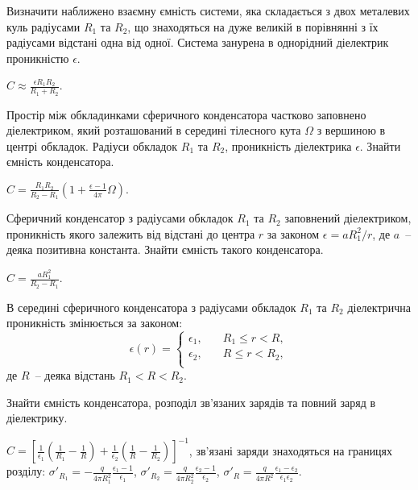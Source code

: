 \begin{problem}
Визначити наближено взаємну ємність системи, яка складається з двох  металевих куль радіусами $R_1$ та $R_2$, що знаходяться на дуже великій в порівнянні з їх радіусами відстані одна від одної. Система занурена в однорідний діелектрик проникністю $\epsilon$.
\begin{solution}
	$C \approx \frac{\epsilon R_1R_2}{R_1 + R_2}$.
\end{solution}
\end{problem}

\begin{problem} %
Простір між обкладинками сферичного конденсатора частково заповнено діелектриком, який розташований в середині тілесного кута $\Omega$ з вершиною в центрі обкладок. Радіуси обкладок $R_1$  та $R_2$, проникність
діелектрика $\epsilon$. Знайти ємність конденсатора.
\begin{solution}
	$C =\frac{R_1R_2}{R_2 - R_1} \left( 1 + \frac{\epsilon - 1}{4\pi}\Omega\right) $.
\end{solution}
\end{problem}

\begin{problem}%
Сферичний конденсатор з радіусами обкладок $R_1$ та $R_2$ заповнений
діелектриком, проникність якого залежить від відстані до центра $r$ за законом $\epsilon = aR_1^2/r$, де $a$~-- деяка позитивна константа. Знайти ємність такого конденсатора.
\begin{solution}
	$C = \frac{aR_1^2}{R_2 - R_1}$.
\end{solution}
\end{problem}

\begin{problem}%
В середині сферичного конденсатора з радіусами обкладок $R_1$ та $R_2$ діелектрична проникність змінюється за законом:
\begin{equation*}
	\epsilon(r) = %
	\begin{cases}
		\epsilon_1, & \quad R_1 \le r < R, \\
		\epsilon_2, & \quad R \le r < R_2, \\
	\end{cases}
\end{equation*}
де $R$~-- деяка відстань $R_1 < R < R_2$.

Знайти ємність конденсатора, розподіл зв'язаних зарядів та повний заряд в діелектрику.
\begin{solution}
	$C = \left[ \frac{1}{\epsilon_1}\left( \frac{1}{R_1} - \frac{1}{R}\right) + \frac{1}{\epsilon_2}\left( \frac{1}{R} - \frac{1}{R_2}\right) \right]^{-1} $, зв'язані заряди знаходяться на границях розділу: $\sigma'_{R_1} = - \frac{q}{4\pi R_1^2}\frac{\epsilon_1 - 1}{\epsilon_1}$, $\sigma'_{R_2} =  \frac{q}{4\pi R_2^2}\frac{\epsilon_2 - 1}{\epsilon_2}$, $\sigma'_{R} = \frac{q}{4\pi R^2}\frac{\epsilon_1 - \epsilon_2}{\epsilon_1\epsilon_2}$.
\end{solution}
\end{problem}

